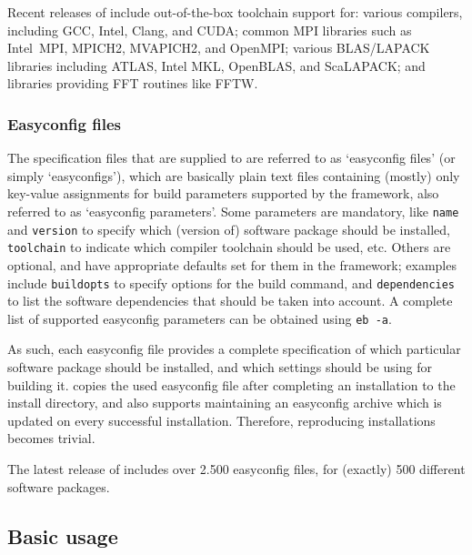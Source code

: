 Recent releases of \easybuild{} include out-of-the-box toolchain support for: various
compilers, including GCC, Intel, Clang, and CUDA; common MPI libraries such as
Intel~MPI, MPICH2, MVAPICH2, and OpenMPI; various BLAS/LAPACK libraries including
ATLAS, Intel MKL, OpenBLAS, and ScaLAPACK; and libraries providing FFT routines
like FFTW.

\subsubsection{Easyconfig files}
\label{sec:eb_easyconfigs}

The specification files that are supplied to \easybuild{} are referred to as
`easyconfig files' (or simply `easyconfigs'), which are basically plain text
files containing (mostly) only key-value assignments for build parameters supported
by the framework, also referred to as `easyconfig parameters'. Some
parameters are mandatory, like \texttt{\small name} and \texttt{\small version} to
specify which (version of) software package should be installed, \texttt{\small
toolchain} to indicate which compiler toolchain should be used, etc. Others are
optional, and have appropriate defaults set for them in the \easybuild{} framework;
examples include \texttt{\small buildopts} to specify options for the build command, 
and \texttt{\small dependencies} to list the software dependencies that should be
taken into account. A complete list of supported easyconfig parameters can be
obtained using \texttt{\small eb -a}.

As such, each easyconfig file provides a complete specification of which particular
software package should be installed, and which settings should be using for building
it. \easybuild{} copies the used easyconfig file after completing an installation
to the install directory, and also supports maintaining an easyconfig archive which
is updated on every successful installation. Therefore, reproducing installations
becomes trivial.

The latest release of \easybuild{} includes over 2.500 easyconfig files, for
(exactly) 500 different software packages.

\subsection{Basic usage}

